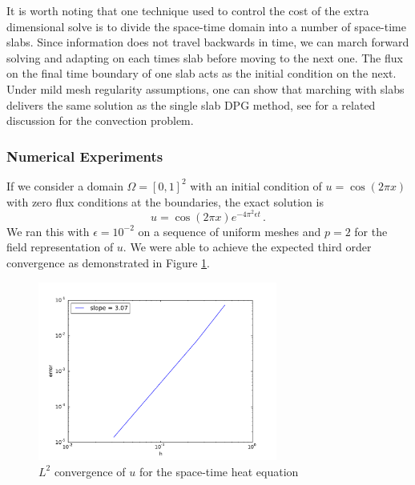 \documentclass[preprint,12pt]{elsarticle}
\begin{document}
It is worth noting that one technique used to control the cost of the extra dimensional solve is to divide the space-time domain into 
a number of space-time slabs. Since information does not travel backwards in time, 
we can march forward solving and adapting on each times slab before moving to the next one. 
The flux on the final time boundary of one slab acts as the initial condition on the next.
Under mild mesh regularity assumptions, one can show that marching with slabs delivers the same solution as the single slab DPG method,
see \cite{DPG2} for a related discussion for the convection problem.

\subsubsection{Numerical Experiments}
If we consider a domain $\Omega=[0,1]^2$ with an initial condition of $u=\cos(2\pi x)$ with zero flux conditions at the boundaries,
the exact solution is
\begin{equation*}
	u=\cos(2\pi x)e^{-4\pi^2\epsilon t}\,.
\end{equation*}
We ran this with $\epsilon=10^{-2}$ on a sequence of uniform meshes and $p=2$ for the field representation of $u$. 
We were able to achieve the expected third order convergence as demonstrated in Figure \ref{fig:spaceTimeHeatConvergence}.

\begin{figure}[!ht]
	\centering
	\includegraphics[width=0.7\textwidth]{SpaceTimeHeat/convergence}
	\caption{$L^2$ convergence of $u$ for the space-time heat equation}
	\label{fig:spaceTimeHeatConvergence}
\end{figure}

\end{document}
